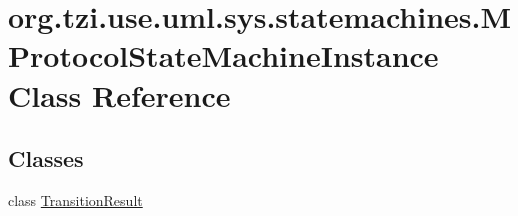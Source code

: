 \hypertarget{classorg_1_1tzi_1_1use_1_1uml_1_1sys_1_1statemachines_1_1_m_protocol_state_machine_instance}{\section{org.\-tzi.\-use.\-uml.\-sys.\-statemachines.\-M\-Protocol\-State\-Machine\-Instance Class Reference}
\label{classorg_1_1tzi_1_1use_1_1uml_1_1sys_1_1statemachines_1_1_m_protocol_state_machine_instance}
}
\subsection*{Classes}
\begin{DoxyCompactItemize}
\item 
class \hyperlink{classorg_1_1tzi_1_1use_1_1uml_1_1sys_1_1statemachines_1_1_m_protocol_state_machine_instance_1_1_transition_result}{Transition\-Result}
\end{DoxyCompactItemize}
